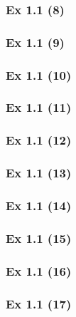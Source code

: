 \subsubsection{Ex 1.1 (8)}\label{sec:Ex_1.1.8}

\subsubsection{Ex 1.1 (9)}\label{sec:Ex_1.1.9}

\subsubsection{Ex 1.1 (10)}\label{sec:Ex_1.1.10}

\newpage		%

\subsubsection{Ex 1.1 (11)}\label{sec:Ex_1.1.11}

\subsubsection{Ex 1.1 (12)}\label{sec:Ex_1.1.12}

\subsubsection{Ex 1.1 (13)}\label{sec:Ex_1.1.13}

\subsubsection{Ex 1.1 (14)}\label{sec:Ex_1.1.14}

\subsubsection{Ex 1.1 (15)}\label{sec:Ex_1.1.15}

\subsubsection{Ex 1.1 (16)}\label{sec:Ex_1.1.16}

\subsubsection{Ex 1.1 (17)}\label{sec:Ex_1.1.17}

